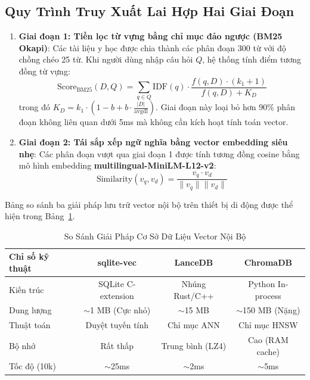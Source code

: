 \documentclass[journal]{IEEEtran}
\begin{document}
\subsection{Quy Trình Truy Xuất Lai Hợp Hai Giai Đoạn}
\begin{enumerate}
\item \textbf{Giai đoạn 1: Tiền lọc từ vựng bằng chỉ mục đảo ngược (BM25 Okapi)}:
Các tài liệu y học được chia thành các phân đoạn 300 từ với độ chồng chéo 25 từ. Khi người dùng nhập câu hỏi $Q$, hệ thống tính điểm tương đồng từ vựng:
\begin{equation}
\text{Score}_{\text{BM25}}(D, Q) = \sum_{q \in Q} \text{IDF}(q) \cdot \frac{f(q, D) \cdot (k_1 + 1)}{f(q, D) + K_D}
\end{equation}
trong đó $K_D = k_1 \cdot \left(1 - b + b \cdot \frac{|D|}{\text{avgdl}}\right)$. Giai đoạn này loại bỏ hơn 90\% phân đoạn không liên quan dưới 5ms mà không cần kích hoạt tính toán vector.


\item \textbf{Giai đoạn 2: Tái sắp xếp ngữ nghĩa bằng vector embedding siêu nhẹ}:
Các phân đoạn vượt qua giai đoạn 1 được tính tương đồng cosine bằng mô hình embedding \textbf{multilingual-MiniLM-L12-v2}:
\begin{equation}
\text{Similarity}(v_q, v_d) = \frac{v_q \cdot v_d}{\|v_q\| \|v_d\|}
\end{equation}
\end{enumerate}

Bảng so sánh ba giải pháp lưu trữ vector nội bộ trên thiết bị di động được thể hiện trong Bảng~\ref{tab:vectordb}.

\begin{table}[t]
\centering
\caption{So Sánh Giải Pháp Cơ Sở Dữ Liệu Vector Nội Bộ}
\label{tab:vectordb}
\begin{tabular}{lccc}
\toprule
\textbf{Chỉ số kỹ thuật} & \textbf{sqlite-vec} & \textbf{LanceDB} & \textbf{ChromaDB} \\
\midrule
Kiến trúc & SQLite C-extension & Nhúng Rust/C++ & Python In-process \\
Dung lượng & $\sim$1 MB (Cực nhỏ) & $\sim$15 MB & $\sim$150 MB (Nặng) \\
Thuật toán & Duyệt tuyến tính & Chỉ mục ANN & Chỉ mục HNSW \\
Bộ nhớ & Rất thấp & Trung bình (LZ4) & Cao (RAM cache) \\
Tốc độ (10k) & $\sim$25ms & $\sim$2ms & $\sim$5ms \\
\bottomrule
\end{tabular}
\end{table}
\end{document}
